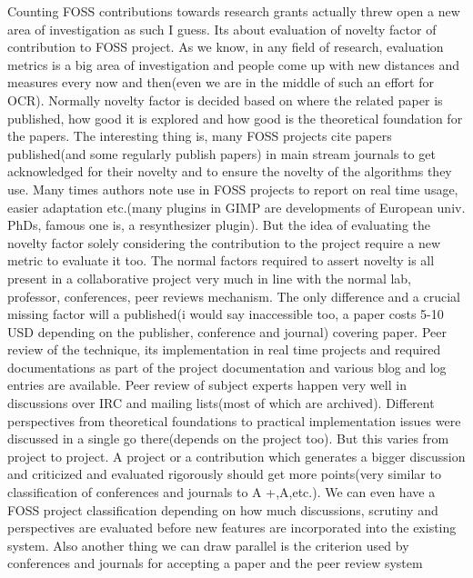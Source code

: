 \vskip 2pt

Counting FOSS contributions towards research grants actually threw open
a new area of investigation as such I guess. Its about evaluation of novelty
factor of contribution to FOSS project. As we know, in any field of research,
evaluation metrics is a big area of investigation and people come up with new
distances and measures every now and then(even we are in the middle of
such an effort for OCR). Normally novelty factor is decided based on where
the related paper is published, how good it is explored and how good is the
theoretical foundation for the papers.  The interesting thing is, many FOSS
projects cite papers published(and some regularly publish papers) in main
stream journals to get acknowledged for their novelty and to ensure the novelty of
the algorithms they use. Many times authors note use in FOSS projects to
report on real time usage, easier adaptation etc.(many plugins in GIMP are
developments of European univ. PhDs, famous one is, a resynthesizer plugin).
But the idea of evaluating the novelty factor solely considering the contribution
to the project require a new metric to evaluate it too. The normal factors
required to assert novelty is all present in a collaborative project very
much in line with the normal lab, professor, conferences, peer reviews mechanism.
The only difference and a crucial missing factor will a published(i would
say inaccessible too, a paper costs 5-10 USD depending on the publisher,
conference and journal) covering paper.  Peer review of the technique,
its implementation in real time projects and required documentations as
part of the project documentation and various blog and log entries are
available. Peer review of subject experts happen very well in discussions
over IRC and mailing lists(most of which are archived). Different perspectives
from theoretical foundations to practical implementation issues were discussed
in a single go there(depends on the project too). But this varies from project
to project. A project or a contribution which generates a bigger discussion
and criticized and evaluated rigorously should get more points(very similar
to classification of conferences and journals to A +,A,etc.).  We can even
have a FOSS project classification depending on how much discussions, scrutiny
and perspectives are evaluated before new features are incorporated into the
existing system. Also another thing we can draw parallel is the criterion used
by conferences and journals for accepting a paper and the peer review system
